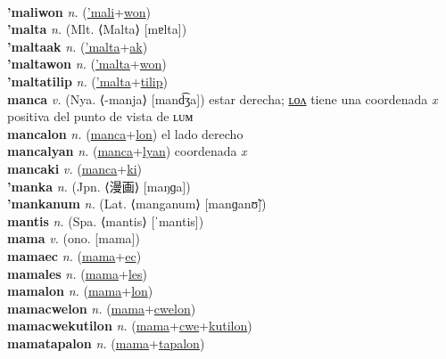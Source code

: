  \label{'maliak} \\
\textbf{'maliwon} \textit{n.} (\hyperref['mali]{'mali}+\hyperref[won]{won})
 \label{'maliwon} \\
\textbf{'malta} \textit{n.} (Mlt. ⟨Malta⟩ [mɐlta])
 \label{'malta} \\
\textbf{'maltaak} \textit{n.} (\hyperref['malta]{'malta}+\hyperref[ak]{ak})
 \label{'maltaak} \\
\textbf{'maltawon} \textit{n.} (\hyperref['malta]{'malta}+\hyperref[won]{won})
 \label{'maltawon} \\
\textbf{'maltatilip} \textit{n.} (\hyperref['malta]{'malta}+\hyperref[tilip]{tilip})
 \label{'maltatilip} \\
\textbf{manca} \textit{v.} (Nya. ⟨-manja⟩ [mand͡ʒa])
estar derecha; \hyperref[mancalon]{ʟᴏᴧ} tiene una coordenada \textit{x} positiva del punto de vista de ʟᴜᴍ \label{manca} \\
\textbf{mancalon} \textit{n.} (\hyperref[manca]{manca}+\hyperref[lon]{lon})
el lado derecho \label{mancalon} \\
\textbf{mancalyan} \textit{n.} (\hyperref[manca]{manca}+\hyperref[lyan]{lyan})
coordenada \textit{x} \label{mancalyan} \\
\textbf{mancaki} \textit{v.} (\hyperref[manca]{manca}+\hyperref[ki]{ki})
 \label{mancaki} \\
\textbf{'manka} \textit{n.} (Jpn. ⟨漫画⟩ [maŋɡa])
 \label{'manka} \\
\textbf{'mankanum} \textit{n.} (Lat. ⟨manganum⟩ [manɡanʊ̃])
 \label{'mankanum} \\
\textbf{mantis} \textit{n.} (Spa. ⟨mantis⟩ [ˈmantis])
 \label{mantis} \\
\textbf{mama} \textit{v.} (ono. [mama])
 \label{mama} \\
\textbf{mamaec} \textit{n.} (\hyperref[mama]{mama}+\hyperref[ec]{ec})
 \label{mamaec} \\
\textbf{mamales} \textit{n.} (\hyperref[mama]{mama}+\hyperref[les]{les})
 \label{mamales} \\
\textbf{mamalon} \textit{n.} (\hyperref[mama]{mama}+\hyperref[lon]{lon})
 \label{mamalon} \\
\textbf{mamacwelon} \textit{n.} (\hyperref[mama]{mama}+\hyperref[cwelon]{cwelon})
 \label{mamacwelon} \\
\textbf{mamacwekutilon} \textit{n.} (\hyperref[mama]{mama}+\hyperref[cwe]{cwe}+\hyperref[kutilon]{kutilon})
 \label{mamacwekutilon} \\
\textbf{mamatapalon} \textit{n.} (\hyperref[mama]{mama}+\hyperref[tapalon]{tapalon})
